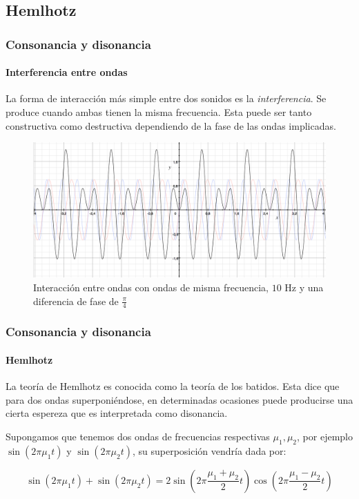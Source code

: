 \documentclass[12 pt]{beamer}
\begin{document}

\subsection{Hemlhotz}

\begin{frame}{9}
    \frametitle{Consonancia y disonancia}
    
    \framesubtitle{Interferencia entre ondas}
    
    La forma de interacción más simple entre dos sonidos es la \emph{interferencia}. Se produce cuando ambas tienen la misma frecuencia. Esta puede ser tanto constructiva como destructiva dependiendo de la fase de las ondas implicadas.
    
    \begin{figure}
        \centering
        \includegraphics[scale = .2]{PiCuartosDiferenciaDeFase}
        \caption{Interacción entre ondas con ondas de misma frecuencia, $10$ Hz y una diferencia de fase de $\frac{\pi}{4}$}
    \end{figure}
        
\end{frame}

\begin{frame}{10}
    \frametitle{Consonancia y disonancia}
    
    \framesubtitle{Hemlhotz}
     
    La teoría de Hemlhotz es conocida como la teoría de los batidos. Esta dice que para dos ondas superponiéndose, en determinadas ocasiones puede producirse una cierta espereza que es interpretada como disonancia.
    
    Supongamos que tenemos dos ondas de frecuencias respectivas $\mu_1, \mu_2$, por ejemplo $\sin(2 \pi \mu_1 t)$ y $\sin(2 \pi \mu_2 t)$, su superposición vendría dada por:
    
    \begin{equation*}
        \boxed{
             \sin(2 \pi \mu_1 t) + \sin(2 \pi \mu_2 t) = 2 \sin\left( 2 \pi \frac{\mu_1 + \mu_2}{2} t \right) \cos \left( 2 \pi \frac{\mu_1 - \mu_2}{2} t \right)
        }
    \end{equation*}
\end{frame}
\end{document}
